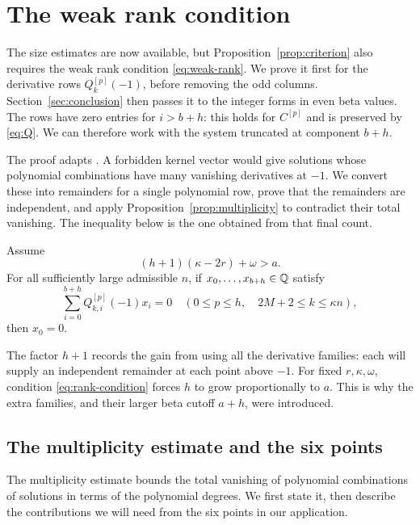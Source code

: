 \section{The weak rank condition}\label{sec:rank}

The size estimates are now available, but Proposition~\ref{prop:criterion}
also requires the weak rank condition \eqref{eq:weak-rank}. We prove it
first for the derivative rows $Q_k^{[p]}(-1)$, before removing the odd
columns. Section~\ref{sec:conclusion} then passes it to the integer forms
in even beta values.
The rows have zero entries for $i>b+h$: this holds for $C^{[p]}$ and
is preserved by \eqref{eq:Q}. We can therefore work with the system
truncated at component $b+h$.

The proof adapts \cite[Section~4.5]{F26}. A forbidden kernel vector would
give solutions whose polynomial combinations have many vanishing
derivatives at $-1$. We convert these into remainders for a single
polynomial row, prove that the remainders are independent, and apply
Proposition~\ref{prop:multiplicity} to contradict their total vanishing.
The inequality below is the one obtained from that final count.

\begin{proposition}\label{prop:rank}
Assume
\begin{equation}\label{eq:rank-condition}
 (h+1)(\kappa-2r)+\omega>a.
\end{equation}
For all sufficiently large admissible $n$, if
$x_0,\ldots,x_{b+h}\in\mathbb Q$ satisfy
\[
 \sum_{i=0}^{b+h}Q_{k,i}^{[p]}(-1)x_i=0
 \quad(0\leq p\leq h,\quad 2M+2\leq k\leq\kappa n),
\]
then $x_0=0$.
\end{proposition}

The factor $h+1$ records the gain from using all the derivative families:
each will supply an independent remainder at each point above $-1$.
For fixed $r,\kappa,\omega$, condition \eqref{eq:rank-condition} forces
$h$ to grow proportionally to $a$. This is why the extra families, and
their larger beta cutoff $a+h$, were introduced.

\subsection{The multiplicity estimate and the six points}\label{subsec:multiplicity}

The multiplicity estimate bounds the total vanishing of polynomial
combinations of solutions in terms of the polynomial degrees. We first
state it, then describe the contributions we will need from the six
points in our application.

